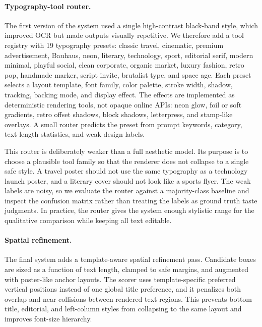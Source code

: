 \documentclass[10pt,twocolumn,letterpaper]{article}
\begin{document}
\paragraph{Typography-tool router.}
The first version of the system used a single high-contrast black-band style, which improved OCR but made outputs visually repetitive. We therefore add a tool registry with 19 typography presets: classic travel, cinematic, premium advertisement, Bauhaus, neon, literary, technology, sport, editorial serif, modern minimal, playful social, clean corporate, organic market, luxury fashion, retro pop, handmade marker, script invite, brutalist type, and space age. Each preset selects a layout template, font family, color palette, stroke width, shadow, tracking, backing mode, and display effect. The effects are implemented as deterministic rendering tools, not opaque online APIs: neon glow, foil or soft gradients, retro offset shadows, block shadows, letterpress, and stamp-like overlays. A small router predicts the preset from prompt keywords, category, text-length statistics, and weak design labels.

This router is deliberately weaker than a full aesthetic model. Its purpose is to choose a plausible tool family so that the renderer does not collapse to a single safe style. A travel poster should not use the same typography as a technology launch poster, and a literary cover should not look like a sports flyer. The weak labels are noisy, so we evaluate the router against a majority-class baseline and inspect the confusion matrix rather than treating the labels as ground truth taste judgments. In practice, the router gives the system enough stylistic range for the qualitative comparison while keeping all text editable.

\paragraph{Spatial refinement.}
The final system adds a template-aware spatial refinement pass. Candidate boxes are sized as a function of text length, clamped to safe margins, and augmented with poster-like anchor layouts. The scorer uses template-specific preferred vertical positions instead of one global title preference, and it penalizes both overlap and near-collisions between rendered text regions. This prevents bottom-title, editorial, and left-column styles from collapsing to the same layout and improves font-size hierarchy.
\end{document}
